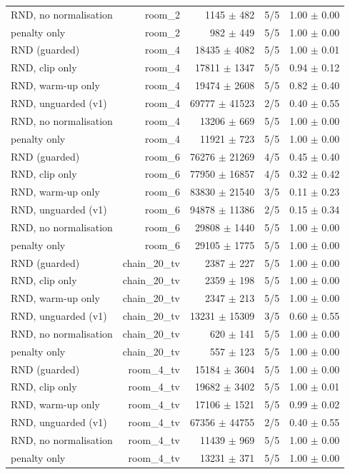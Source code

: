 \begin{tabular}{lrrrr}
RND, no normalisation & room\_2 & 1145 $\pm$ 482 & 5/5 & 1.00 $\pm$ 0.00 \\
penalty only & room\_2 & 982 $\pm$ 449 & 5/5 & 1.00 $\pm$ 0.00 \\
RND (guarded) & room\_4 & 18435 $\pm$ 4082 & 5/5 & 1.00 $\pm$ 0.01 \\
RND, clip only & room\_4 & 17811 $\pm$ 1347 & 5/5 & 0.94 $\pm$ 0.12 \\
RND, warm-up only & room\_4 & 19474 $\pm$ 2608 & 5/5 & 0.82 $\pm$ 0.40 \\
RND, unguarded (v1) & room\_4 & 69777 $\pm$ 41523 & 2/5 & 0.40 $\pm$ 0.55 \\
RND, no normalisation & room\_4 & 13206 $\pm$ 669 & 5/5 & 1.00 $\pm$ 0.00 \\
penalty only & room\_4 & 11921 $\pm$ 723 & 5/5 & 1.00 $\pm$ 0.00 \\
RND (guarded) & room\_6 & 76276 $\pm$ 21269 & 4/5 & 0.45 $\pm$ 0.40 \\
RND, clip only & room\_6 & 77950 $\pm$ 16857 & 4/5 & 0.32 $\pm$ 0.42 \\
RND, warm-up only & room\_6 & 83830 $\pm$ 21540 & 3/5 & 0.11 $\pm$ 0.23 \\
RND, unguarded (v1) & room\_6 & 94878 $\pm$ 11386 & 2/5 & 0.15 $\pm$ 0.34 \\
RND, no normalisation & room\_6 & 29808 $\pm$ 1440 & 5/5 & 1.00 $\pm$ 0.00 \\
penalty only & room\_6 & 29105 $\pm$ 1775 & 5/5 & 1.00 $\pm$ 0.00 \\
RND (guarded) & chain\_20\_tv & 2387 $\pm$ 227 & 5/5 & 1.00 $\pm$ 0.00 \\
RND, clip only & chain\_20\_tv & 2359 $\pm$ 198 & 5/5 & 1.00 $\pm$ 0.00 \\
RND, warm-up only & chain\_20\_tv & 2347 $\pm$ 213 & 5/5 & 1.00 $\pm$ 0.00 \\
RND, unguarded (v1) & chain\_20\_tv & 13231 $\pm$ 15309 & 3/5 & 0.60 $\pm$ 0.55 \\
RND, no normalisation & chain\_20\_tv & 620 $\pm$ 141 & 5/5 & 1.00 $\pm$ 0.00 \\
penalty only & chain\_20\_tv & 557 $\pm$ 123 & 5/5 & 1.00 $\pm$ 0.00 \\
RND (guarded) & room\_4\_tv & 15184 $\pm$ 3604 & 5/5 & 1.00 $\pm$ 0.00 \\
RND, clip only & room\_4\_tv & 19682 $\pm$ 3402 & 5/5 & 1.00 $\pm$ 0.01 \\
RND, warm-up only & room\_4\_tv & 17106 $\pm$ 1521 & 5/5 & 0.99 $\pm$ 0.02 \\
RND, unguarded (v1) & room\_4\_tv & 67356 $\pm$ 44755 & 2/5 & 0.40 $\pm$ 0.55 \\
RND, no normalisation & room\_4\_tv & 11439 $\pm$ 969 & 5/5 & 1.00 $\pm$ 0.00 \\
penalty only & room\_4\_tv & 13231 $\pm$ 371 & 5/5 & 1.00 $\pm$ 0.00 \\
\hline
\end{tabular}
